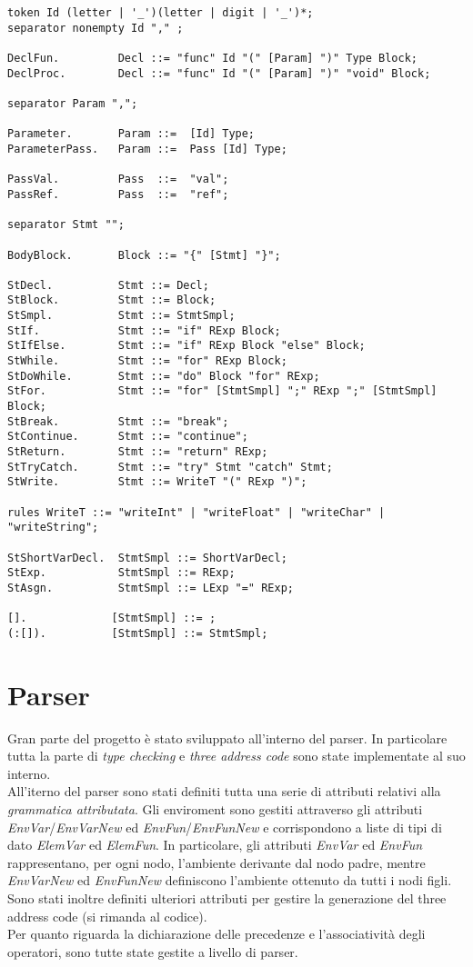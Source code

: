 \documentclass[12pt]{article}
\begin{document}
\begin{verbatim}
token Id (letter | '_')(letter | digit | '_')*;
separator nonempty Id "," ;

DeclFun.         Decl ::= "func" Id "(" [Param] ")" Type Block;
DeclProc.        Decl ::= "func" Id "(" [Param] ")" "void" Block;

separator Param ",";

Parameter.       Param ::=  [Id] Type;
ParameterPass.   Param ::=  Pass [Id] Type;

PassVal.         Pass  ::=  "val";
PassRef.         Pass  ::=  "ref";

separator Stmt "";

BodyBlock.       Block ::= "{" [Stmt] "}";

StDecl.          Stmt ::= Decl;
StBlock.         Stmt ::= Block;
StSmpl.          Stmt ::= StmtSmpl;
StIf.            Stmt ::= "if" RExp Block;
StIfElse.        Stmt ::= "if" RExp Block "else" Block;
StWhile.         Stmt ::= "for" RExp Block;
StDoWhile.       Stmt ::= "do" Block "for" RExp;
StFor.           Stmt ::= "for" [StmtSmpl] ";" RExp ";" [StmtSmpl] Block;
StBreak.         Stmt ::= "break";
StContinue.      Stmt ::= "continue";
StReturn.        Stmt ::= "return" RExp;
StTryCatch.      Stmt ::= "try" Stmt "catch" Stmt;
StWrite.         Stmt ::= WriteT "(" RExp ")";

rules WriteT ::= "writeInt" | "writeFloat" | "writeChar" | "writeString";

StShortVarDecl.  StmtSmpl ::= ShortVarDecl;
StExp.           StmtSmpl ::= RExp;
StAsgn.          StmtSmpl ::= LExp "=" RExp;

[].             [StmtSmpl] ::= ;
(:[]).          [StmtSmpl] ::= StmtSmpl;
\end{verbatim}

\section{Parser}
Gran parte del progetto è stato sviluppato all'interno del parser. In particolare tutta la parte di \textit{type checking} e \textit{three address code} sono state implementate al suo interno.\\
All'iterno del parser sono stati definiti tutta una serie di attributi relativi alla \textit{grammatica attributata}.
Gli enviroment sono gestiti attraverso gli attributi \textit{EnvVar}/\textit{EnvVarNew} ed \textit{EnvFun}/\textit{EnvFunNew} e corrispondono a liste di tipi di dato \textit{ElemVar} ed \textit{ElemFun}. In particolare, gli attributi \textit{EnvVar} ed \textit{EnvFun} rappresentano, per ogni nodo, l'ambiente  derivante dal nodo padre, mentre \textit{EnvVarNew} ed \textit{EnvFunNew} definiscono l'ambiente ottenuto da tutti i nodi figli.
Sono stati inoltre definiti ulteriori attributi per gestire la generazione del three address code (si rimanda al codice).\\
Per quanto riguarda la dichiarazione delle precedenze e l'associatività degli operatori, sono tutte state gestite a livello di parser.
\end{document}
